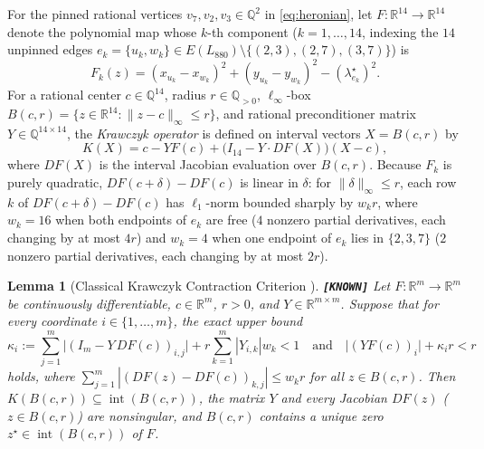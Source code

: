 \documentclass[11pt,a4paper]{article}
\newtheorem{lemma}{Lemma}
\theoremstyle{definition}
\theoremstyle{remark}
\newcommand{\claimtag}[1]{\textup{\textbf{\texttt{[#1]}}}}
\begin{document}
For the pinned rational vertices $v_7, v_2, v_3 \in \mathbb{Q}^2$ in \eqref{eq:heronian}, let $F \colon \mathbb{R}^{14} \to \mathbb{R}^{14}$ denote the polynomial map whose $k$-th component ($k = 1,\dots,14$, indexing the $14$ unpinned edges $e_k = \{u_k, w_k\} \in E(L_{880}) \setminus \{(2,3),(2,7),(3,7)\}$) is
\begin{equation}\label{eq:Fmap}
F_k(z) = (x_{u_k} - x_{w_k})^2 + (y_{u_k} - y_{w_k})^2 - (\lambda_{e_k}^\star)^2.
\end{equation}
For a rational center $c \in \mathbb{Q}^{14}$, radius $r \in \mathbb{Q}_{>0}$, $\ell_\infty$-box $B(c, r) = \{z \in \mathbb{R}^{14} : \|z - c\|_\infty \le r\}$, and rational preconditioner matrix $Y \in \mathbb{Q}^{14 \times 14}$, the \emph{Krawczyk operator} \cite{Kra69,Rum10} is defined on interval vectors $X = B(c, r)$ by
\begin{equation}\label{eq:krawczyk}
K(X) = c - Y F(c) + \bigl(I_{14} - Y \cdot DF(X)\bigr)(X - c),
\end{equation}
where $DF(X)$ is the interval Jacobian evaluation over $B(c, r)$. Because $F_k$ is purely quadratic, $DF(c + \delta) - DF(c)$ is linear in $\delta$: for $\|\delta\|_\infty \le r$, each row $k$ of $DF(c+\delta) - DF(c)$ has $\ell_1$-norm bounded sharply by $w_k r$, where $w_k = 16$ when both endpoints of $e_k$ are free ($4$ nonzero partial derivatives, each changing by at most $4r$) and $w_k = 4$ when one endpoint of $e_k$ lies in $\{2,3,7\}$ ($2$ nonzero partial derivatives, each changing by at most $2r$).

\begin{lemma}[Classical Krawczyk Contraction Criterion {\cite{Kra69,Rum10}}]
\label{lem:krawczyk}
\claimtag{KNOWN} Let $F \colon \mathbb{R}^m \to \mathbb{R}^m$ be continuously differentiable, $c \in \mathbb{R}^m$, $r > 0$, and $Y \in \mathbb{R}^{m \times m}$. Suppose that for every coordinate $i \in \{1,\dots,m\}$, the exact upper bound
\begin{equation}\label{eq:kbound}
\kappa_i := \sum_{j=1}^m \bigl|(I_m - Y \, DF(c))_{i,j}\bigr| + r \sum_{k=1}^m |Y_{i,k}| w_k < 1
\quad\text{and}\quad
\bigl|(Y F(c))_i\bigr| + \kappa_i r < r
\end{equation}
holds, where $\sum_{j=1}^m |(DF(z) - DF(c))_{k,j}| \le w_k r$ for all $z \in B(c,r)$. Then $K(B(c,r)) \subseteq \operatorname{int}(B(c,r))$, the matrix $Y$ and every Jacobian $DF(z)$ ($z \in B(c,r)$) are nonsingular, and $B(c,r)$ contains a unique zero $z^\star \in \operatorname{int}(B(c,r))$ of $F$.
\end{lemma}
\end{document}
